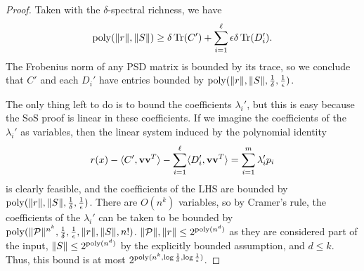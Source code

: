 \begin{proof}
Taken with the $\delta$-spectral richness, we have
\[\operatorname{poly}(\|r\|,\|S\|) \geq \delta \operatorname{Tr}(C') + \sum_{i=1}^\ell \epsilon\delta \operatorname{Tr}(D_i').\]
The Frobenius norm of any PSD matrix is bounded by its trace, so we conclude that $C'$ and each $D_i'$ have entries bounded by $\operatorname{poly}(\|r\|, \|S\|, \frac{1}{\delta}, \frac{1}{\epsilon})$.

The only thing left to do is to bound the coefficients $\lambda_i'$, but this is easy because the SoS proof is linear in these coefficients. If we imagine the coefficients of the $\lambda_i'$ as variables, then the linear system induced by the polynomial identity
\[r(x) - \langle C', {\bf v}{\bf v}^T\rangle - \sum_{i=1}^\ell \langle D_i', {\bf v}{\bf v}^T\rangle = \sum_{i=1}^m \lambda_i' p_i\]
is clearly feasible, and the coefficients of the LHS are bounded by $\operatorname{poly}(\|r\|, \|S\|, \frac{1}{\delta}, \frac{1}{\epsilon})$. There are $O(n^k)$ variables, so by Cramer's rule, the coefficients of the $\lambda_i'$ can be taken to be bounded by $\operatorname{poly}(\|\mathcal P\|^{n^k}, \frac{1}{\delta}, \frac{1}{\epsilon}, \|r\|, \|S\|, n!)$. $\|\mathcal P\|, \|r\| \leq 2^{\operatorname{poly}(n^d)}$ as they are considered part of the input, $\|S\| \leq 2^{\operatorname{poly}(n^d)}$ by the explicitly bounded assumption, and $d \leq k$. Thus, this bound is at most $2^{\operatorname{poly}(n^k, \log \frac{1}{\delta}, \log \frac{1}{\epsilon})}$.



\end{proof}
